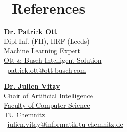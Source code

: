 \documentclass[]{resume}
\begin{document}
\begin{minipage}[t]{0.66\textwidth}

\section{{\faGroup~}References} 
\begin{minipage}{0.5\textwidth}
\begin{flushleft}
{\large \bf\href{http://patrick-ott.de}{Dr. Patrick Ott}} \\
Dipl-Inf. (FH), HRF (Leeds)\\
Machine Learning Expert\\
\href{http://www.ott-busch.com}{Ott \& Busch Intelligent Solution} \\
\href{mailto:patrick.ott@ott-busch.com}{\small\faEnvelopeAlt}~\href{mailto:patrick.ott@ott-busch.com}{patrick.ott@ott-busch.com}
\end{flushleft}
\end{minipage} \hspace{-1cm}
\begin{minipage}{0.5\textwidth}
\begin{flushleft}
{\large\bf\href{https://www-user.tu-chemnitz.de/~vitay/}{Dr. Julien Vitay}} \\
\href{https://www.tu-chemnitz.de/informatik/KI}{Chair of Artificial Intelligence}\\
\href{https://www.tu-chemnitz.de/informatik}{Faculty of Computer Science}\\
\href{https://www.tu-chemnitz.de}{TU Chemnitz} \\
\href{mailto:julien.vitay@informatik.tu-chemnitz.de}{\small\faEnvelopeAlt}~\href{mailto:julien.vitay@informatik.tu-chemnitz.de}{julien.vitay@informatik.tu-chemnitz.de}
\end{flushleft} 
\end{minipage}
\endsubsection

\end{minipage} 
\end{document}
